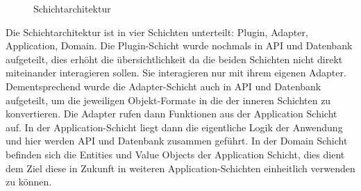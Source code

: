 \begin{figure}[htbp]
    \centering
    \caption{\label{flutter-1} Schichtarchitektur}
\end{figure}

Die Schichtarchitektur ist in vier Schichten unterteilt: Plugin, Adapter, Application, Domain.
Die Plugin-Schicht wurde nochmals in API und Datenbank aufgeteilt,
dies erhöht die übersichtlichkeit da die beiden Schichten nicht direkt miteinander interagieren sollen.
Sie interagieren nur mit ihrem eigenen Adapter.
Dementsprechend wurde die Adapter-Schicht auch in API und Datenbank aufgeteilt, um die jeweiligen Objekt-Formate in die der inneren Schichten zu konvertieren.
Die Adapter rufen dann Funktionen aus der Application Schicht auf.
In der Application-Schicht liegt dann die eigentliche Logik der Anwendung und hier werden API und Datenbank zusammen geführt.
In der Domain Schicht befinden sich die Entities und Value Objects der Application Schicht,
dies dient dem Ziel diese in Zukunft in weiteren Application-Schichten einheitlich verwenden zu können.
